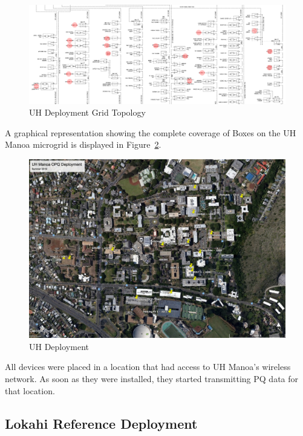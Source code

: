 \begin{figure}
	\centering
	\includegraphics[width=\linewidth]{figures/uh_thesis_depoyment_v1.png}
	\caption{UH Deployment Grid Topology}
	\label{fig:UhGridTopo}
\end{figure}

A graphical representation showing the complete coverage of Boxes on the UH Manoa microgrid is displayed in Figure~\ref{fig:UhDeploy}.

\begin{figure}
	\centering
	\includegraphics[width=\linewidth]{figures/deploy.jpg}
	\caption{UH Deployment}
	\label{fig:UhDeploy}
\end{figure}

All devices were placed in a location that had access to UH Manoa's wireless network. As soon as they were installed, they started transmitting PQ data for that location.

\subsection{Lokahi Reference Deployment}\label{subsec:lokahi-reference-deployment}

